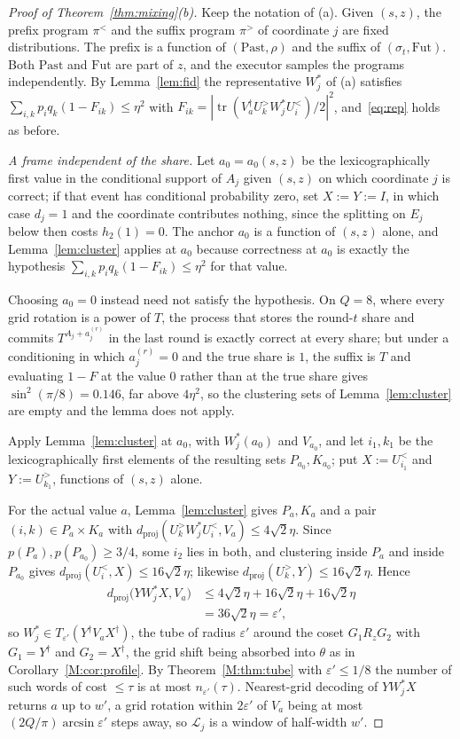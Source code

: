 \documentclass[aps,prx,twocolumn,superscriptaddress,nofootinbib,longbibliography]{revtex4-2}
\theoremstyle{plain}
\theoremstyle{definition}
\theoremstyle{remark}
\newcommand{\dproj}{d_{\mathrm{proj}}}
\newcommand{\tr}{\operatorname{tr}}
\begin{document}
\begin{proof}[Proof of Theorem~\ref{thm:mixing}(b)]
Keep the notation of (a). Given $(s,z)$, the prefix program $\pi^<$ and the suffix program $\pi^>$ of coordinate $j$ are fixed distributions. The prefix is a function of $(\mathrm{Past},\rho)$ and the suffix of $(\sigma_t,\mathrm{Fut})$. Both $\mathrm{Past}$ and $\mathrm{Fut}$ are part of $z$, and the executor samples the programs independently. By Lemma~\ref{lem:fid} the representative $W^*_j$ of (a) satisfies $\sum_{i,k}p_iq_k(1-F_{ik})\le\eta^2$ with $F_{ik}=|\tr(V_a^\dagger U^>_kW^*_jU^<_i)/2|^2$, and~\eqref{eq:rep} holds as before.

\emph{A frame independent of the share.} Let $a_0=a_0(s,z)$ be the lexicographically first value in the conditional support of $A_j$ given $(s,z)$ on which coordinate $j$ is correct; if that event has conditional probability zero, set $X:=Y:=I$, in which case $d_j=1$ and the coordinate contributes nothing, since the splitting on $E_j$ below then costs $h_2(1)=0$. The anchor $a_0$ is a function of $(s,z)$ alone, and Lemma~\ref{lem:cluster} applies at $a_0$ because correctness at $a_0$ is exactly the hypothesis $\sum_{i,k}p_iq_k(1-F_{ik})\le\eta^2$ for that value. 

Choosing $a_0=0$ instead need not satisfy the hypothesis. On $Q=8$, where every grid rotation is a power of $T$, the process that stores the round-$t$ share and commits $T^{A_j+a^{(r)}_j}$ in the last round is exactly correct at every share; but under a conditioning in which $a^{(r)}_j=0$ and the true share is $1$, the suffix is $T$ and evaluating $1-F$ at the value $0$ rather than at the true share gives $\sin^2(\pi/8)=0.146$, far above $4\eta^2$, so the clustering sets of Lemma~\ref{lem:cluster} are empty and the lemma does not apply.

Apply Lemma~\ref{lem:cluster} at $a_0$, with $W^*_j(a_0)$ and $V_{a_0}$, and let $i_1,k_1$ be the lexicographically first elements of the resulting sets $P_{a_0},K_{a_0}$; put $X:=U^<_{i_1}$ and $Y:=U^>_{k_1}$, functions of $(s,z)$ alone. 

For the actual value $a$, Lemma~\ref{lem:cluster} gives $P_a,K_a$ and a pair $(i,k)\in P_a\times K_a$ with $\dproj(U^>_kW^*_jU^<_i,V_a)\le4\sqrt2\eta$. Since $p(P_a),p(P_{a_0})\ge3/4$, some $i_2$ lies in both, and clustering inside $P_a$ and inside $P_{a_0}$ gives $\dproj(U^<_i,X)\le16\sqrt2\eta$; likewise $\dproj(U^>_k,Y)\le16\sqrt2\eta$. Hence
\[
\begin{aligned}
\dproj\big(YW^*_jX,V_a\big)&\le4\sqrt2\eta+16\sqrt2\eta+16\sqrt2\eta\\
&=36\sqrt2\eta=\varepsilon',
\end{aligned}
\]
so $W^*_j\in T_{\varepsilon'}(Y^\dagger V_aX^\dagger)$, the tube of radius $\varepsilon'$ around the coset $G_1R_zG_2$ with $G_1=Y^\dagger$ and $G_2=X^\dagger$, the grid shift being absorbed into $\theta$ as in Corollary~\ref{M:cor:profile}. By Theorem~\ref{M:thm:tube} with $\varepsilon'\le1/8$ the number of such words of cost $\le\tau$ is at most $n_{\varepsilon'}(\tau)$. Nearest-grid decoding of $YW^*_jX$ returns $a$ up to $w'$, a grid rotation within $2\varepsilon'$ of $V_a$ being at most $(2Q/\pi)\arcsin\varepsilon'$ steps away, so $\mathcal L_j$ is a window of half-width $w'$.


\end{proof}
\end{document}
